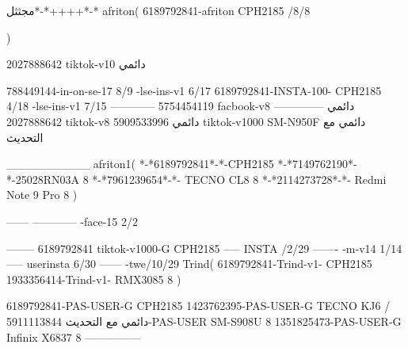 مجثثل*-*++++*-*
afriton(
6189792841-afriton CPH2185  /8/8

)

2027888642 tiktok-v10
دائمي

788449144-in-on-se-17 8/9
-lse-ins-v1 6/17
6189792841-INSTA-100- CPH2185 4/18
-lse-ins-v1 7/15
------------
5754454119 facbook-v8
دائمي
--------------
2027888642 tiktok-v8
دائمي
5909533996 tiktok-v1000  SM-N950F
دائمي مع التحديث

__________
afriton1(
*-*6189792841*-*-CPH2185
*-*7149762190*-*-25028RN03A  8
*-*7961239654*-*- TECNO CL8  8
*-*2114273728*-*- Redmi Note 9 Pro  8
)


------
------------
-face-15 2/2

--------
6189792841 tiktok-v1000-G CPH2185 
-----
 INSTA /2/29
-------
-m-v14 1/14
-----
userinsta 6/30
------
-twe/10/29
Trind(
6189792841-Trind-v1- CPH2185 
1933356414-Trind-v1- RMX3085 8
)


6189792841-PAS-USER-G CPH2185 
1423762395-PAS-USER-G TECNO KJ6  /دائمي مع التحديث
5911113844-PAS-USER SM-S908U 8
1351825473-PAS-USER-G Infinix X6837 8
    ---------------
